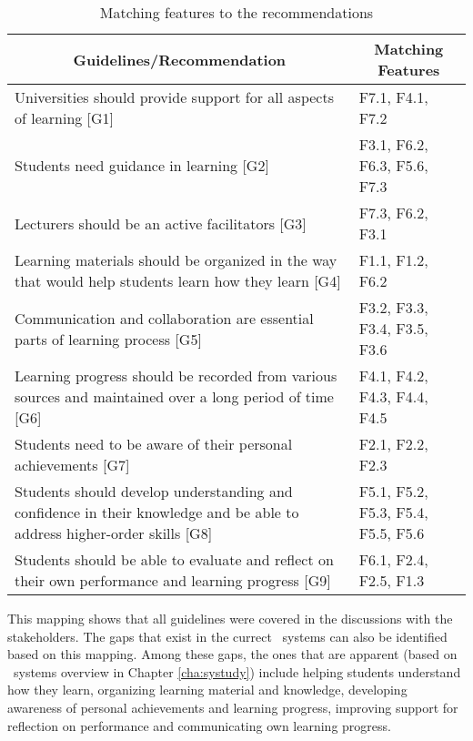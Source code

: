 \begin{table}[hb] \small
\centering
    \setlength{\abovecaptionskip}{0pt}
	\caption{Matching features to the recommendations}
    \begin{tabular}{|p{9.8cm}|p{2.6cm}|}
     \hline
     \multicolumn{1}{|c|}{\textbf{Guidelines/Recommendation}} &
     \multicolumn{1}{c|}{\textbf{Matching Features}} \\
     \hline
    Universities should provide support for all aspects of learning [G1] & F7.1,
    F4.1, F7.2 \\ \hline 
    Students need guidance in learning [G2] & F3.1, F6.2, F6.3, F5.6, F7.3
    \\ \hline
    Lecturers should be an active facilitators [G3] & F7.3, F6.2, F3.1 \\ \hline
    Learning materials should be organized in the way that would help students
	learn how they learn [G4] & F1.1, F1.2, F6.2 \\ \hline 
    Communication and collaboration are essential parts of learning process [G5]
    & F3.2, F3.3, F3.4, F3.5, F3.6 \\ \hline 
	Learning progress should be recorded from various sources and maintained
    over a long period of time [G6] & F4.1, F4.2, F4.3, F4.4, F4.5 \\ \hline 
    Students need to be aware of their personal achievements [G7] & F2.1, F2.2,
    F2.3 \\ \hline 
	Students should develop understanding and confidence in their knowledge and
	be able to address higher-order skills [G8] & F5.1, F5.2, F5.3, F5.4, F5.5,
	F5.6 \\	\hline 
	Students should be able to evaluate and reflect on their own performance and
	learning progress [G9] & F6.1, F2.4, F2.5, F1.3 \\ \hline 
    \end{tabular}
    \label{tab:mapping}
\end{table}

This mapping shows that all guidelines were covered in the discussions with the
stakeholders. The gaps that exist in the currect \ep~systems can also be
identified based on this mapping. Among these gaps, the ones that are apparent
(based on \ep~systems overview in Chapter \ref{cha:systudy}) include helping
students understand how they learn, organizing learning material and knowledge,
developing awareness of personal achievements and learning progress, improving
support for reflection on performance and communicating own learning progress.

